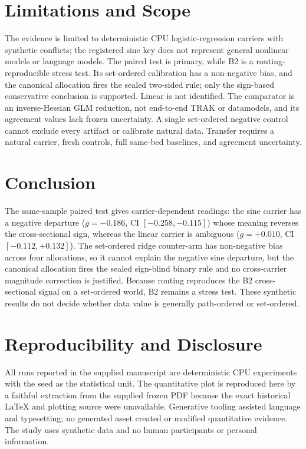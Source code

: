\documentclass{article}
\begin{document}
\section{Limitations and Scope}
The evidence is limited to deterministic CPU logistic-regression carriers with synthetic conflicts;
the registered sine key does not represent general nonlinear models or language models. The paired
test is primary, while B2 is a routing-reproducible stress test. Its set-ordered calibration has a
non-negative bias, and the canonical allocation fires the sealed two-sided rule; only the sign-based
conservative conclusion is supported. Linear is not identified. The comparator is an
inverse-Hessian GLM reduction, not end-to-end TRAK or datamodels, and its agreement values lack
frozen uncertainty. A single set-ordered negative control cannot exclude every artifact or calibrate
natural data. Transfer requires a natural carrier, fresh controls, full same-bed baselines, and
agreement uncertainty.

\section{Conclusion}
The same-sample paired test gives carrier-dependent readings: the sine carrier has a negative
departure ($g=-0.186$, CI $[-0.258,-0.115]$) whose meaning reverses the cross-sectional sign,
whereas the linear carrier is ambiguous ($g=+0.010$, CI $[-0.112,+0.132]$). The set-ordered ridge
counter-arm has non-negative bias across four allocations, so it cannot explain the negative sine
departure, but the canonical allocation fires the sealed sign-blind binary rule and no cross-carrier
magnitude correction is justified. Because routing reproduces the B2 cross-sectional signal on a
set-ordered world, B2 remains a stress test. These synthetic results do not decide whether data value
is generally path-ordered or set-ordered.

\FloatBarrier
\label{p5:main-text-end}



\appendix
\section{Reproducibility and Disclosure}
All runs reported in the supplied manuscript are deterministic CPU experiments with the seed as the
statistical unit. The quantitative plot is reproduced here by a faithful extraction from the supplied
frozen PDF because the exact historical LaTeX and plotting source were unavailable. Generative
tooling assisted language and typesetting; no generated asset created or modified quantitative
evidence. The study uses synthetic data and no human participants or personal information.
\end{document}
